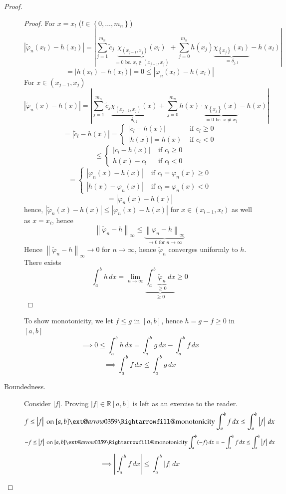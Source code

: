\documentclass{article}
\makeatletter
\newcommand{\set}[1]{\left\{#1\right\}}
\newcommand{\norm}[1]{\left\|#1\right\|}
\newcommand{\card}[1]{\left|#1\right|}
\newcommand{\xRightarrow}[2][]{\ext@arrow 0359\Rightarrowfill@{#1}{#2}}
\makeatother
\begin{document}
\begin{proof}
\begin{description}
\begin{proof}
        For $x = x_l$ ($l \in \set{0, \dots, m_n}$)
        \[
          \card{\tilde \varphi_n(x_l) - h(x_l)}
            = \card{\sum_{j=1}^{m_n} \tilde c_j \underbrace{\chi_{(x_{j-1}, x_j)}(x_l)}_{=0 \text{ bc. } x_l \not\in (x_{j-1}, x_j)} + \sum_{j=0}^{m_n} h(x_j) \underbrace{\chi_{\set{x_j}}(x_l)}_{= \delta_{j,l}} - h(x_l)}
        \] \[
          = \card{h(x_l) - h(x_l)} = 0 \leq \card{\varphi_n(x_l) - h(x_l)}
        \]
        For $x \in (x_{j-1}, x_j)$
        \[
          \card{\tilde\varphi_n(x) - h(x)}
            = \card{\sum_{j=1}^{m_n} \tilde c_j \underbrace{\chi_{(x_{j-1}, x_j)}(x)}_{\delta_{l,j}} + \sum_{j=0}^{m_n} h(x) \cdot \underbrace{\chi_{\set{x_j}}(x)}_{=0 \text{ bc. } x \neq x_j} - h(x)}
        \] \[
          = \card{\tilde c_l - h(x)}
          = \begin{cases}
            \card{c_l - h(x)} & \text{ if } c_l \geq 0 \\
            \card{h(x)} = h(x) & \text{ if } c_l < 0
          \end{cases}
        \] \[
          \leq \begin{cases}
            \card{c_l - h(x)} & \text{ if } c_l \geq 0 \\
            h(x) - c_l & \text{ if } c_l < 0
          \end{cases}
        \] \[
          = \begin{cases}
            \card{\varphi_n(x) - h(x)} & \text{ if } c_l = \varphi_n(x) \geq 0 \\
            \card{h(x) - \varphi_n(x)} & \text{ if } c_l = \varphi_n(x) < 0
          \end{cases}
        \] \[
          = \card{\varphi_n(x) - h(x)}
        \]
        hence, $\card{\tilde\varphi_n(x) - h(x)} \leq \card{\varphi_n(x) - h(x)}$
        for $x \in (x_{l-1}, x_l)$ as well as $x = x_i$,
        hence
        \[ \norm{\tilde\varphi_n - h}_{\infty} \leq \underbrace{\norm{\varphi_n - h}_{\infty}}_{\to 0 \text{ for } n \to \infty} \]
        Hence $\norm{\tilde\varphi_n - h}_{\infty} \to 0$ for $n \to \infty$, hence $\tilde\varphi_n$ converges uniformly to $h$.
        There exists
        \[ \int_a^b h \, dx = \lim_{n\to\infty} \underbrace{\int_a^b \underbrace{\tilde\varphi_n}_{\geq 0} \, dx}_{\geq 0} \geq 0 \]
      \end{proof}

      To show monotonicity, we let $f \leq g$ in $[a,b]$, hence $h = g - f \geq 0$ in $[a,b]$
      \[ \implies 0 \leq \int_a^b h \, dx = \int_a^b g \, dx - \int_a^b f \, dx \]
      \[ \implies \int_a^b f \, dx \leq \int_a^b g \, dx \]
    \item[Boundedness.]
      Consider $\card{f}$. Proving $\card{f} \in \mathbb R[a,b]$ is left as an exercise to the reader.
      \[ f \leq \card{f} \text{ on } [a,b] \xRightarrow{\text{monotonicity}} \int_a^b f \, dx \leq \int_a^b \card{f} \, dx \]
      \[ -f \leq \card{f} \text{ on } [a,b] \xRightarrow{\text{monotonicity}} \int_a^b (-f) \, dx = -\int_a^b f \, dx \leq \int_a^b \card{f} \, dx \]
      \[ \implies \card{\int_a^b f \, dx} \leq \int_a^b \card{f} \, dx \]
  \end{description}
\end{proof}
\end{document}
